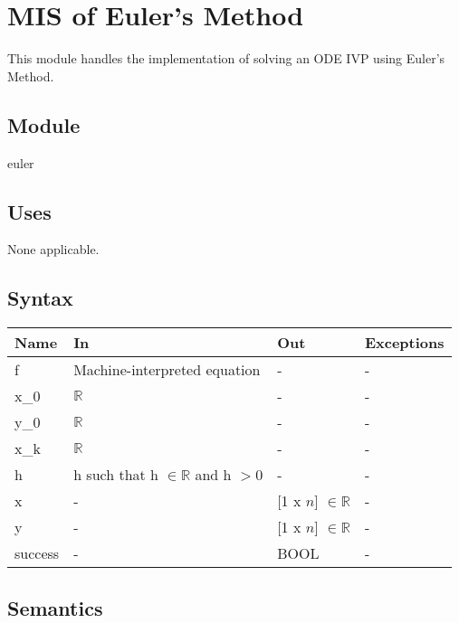 \documentclass[12pt, titlepage]{article}
\begin{document}
\newpage


\section{MIS of Euler's Method} \label{modEuler}
This module handles the implementation of solving an ODE IVP using Euler's Method. 

\subsection{Module}
euler

\subsection{Uses}

None applicable.

\subsection{Syntax}

\begin{center}
\begin{tabular}{p{4cm} p{4cm} p{4cm} p{2cm}}
\hline
\textbf{Name} & \textbf{In} & \textbf{Out} & \textbf{Exceptions} \\
\hline
f & Machine-interpreted equation & - & -\\
x\_0 & $\mathbb{R}$ & - & -\\
y\_0 & $\mathbb{R}$ & - & -\\
x\_k & $\mathbb{R}$ & - & -\\
h & h such that h $\in \mathbb{R}$ and h $> 0$ & - & -\\
x & - & [1 x $n$] $\in \mathbb{R}$ & - \\
y & - & [1 x $n$] $\in \mathbb{R}$ & - \\
success & - & BOOL & - \\
\hline
\end{tabular}
\end{center}



\subsection{Semantics}
\end{document}

